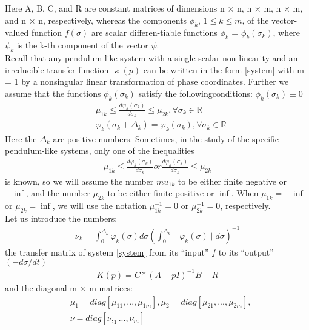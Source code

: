 \documentclass[a4paper]{article}
\begin{document}
Here A, B, C, and R are constant matrices of dimensions n × n, n × m, n × m, and n × n, respectively, whereas the components $\phi_k$, $1 \leq  k \leq m$, of the vector-valued function $f(\sigma)$ are scalar differen-tiable functions $\phi_k$ = $\phi_k(\sigma_k)$, where $\psi_k$ is the k-th component of the vector $\psi$.\\

Recall that any pendulum-like system with a single scalar non-linearity and an irreducible transfer function $\varkappa(p)$ can be written in the form \ref{system} with m = 1 by a nonsingular linear transformation of phase coordinates. Further we assume that the functions $\phi_k(\sigma_k)$ satisfy the followingconditions: $\phi_k(\sigma_k) \equiv 0$\\
 \begin{equation}
 \begin{aligned}
&\mu_{1k} \leq \frac{d\varphi_k(\sigma_k)}{d\sigma_k} \leq \mu_{2k}, \forall \sigma_k \in \mathbb{R}\\
&\varphi_k(\sigma_k+\Delta_k) = \varphi_k(\sigma_k), \forall \sigma_k \in \mathbb{R}
 \end{aligned}
\end{equation}
Here the $\Delta_k$ are positive numbers. Sometimes, in the study of the specific pendulum-like systems, only one of the inequalities
 \begin{equation}
 \begin{aligned}
\mu_{1k} \leq \frac{d\varphi_k(\sigma_k)}{d\sigma_k}  or \frac{d\varphi_k(\sigma_k)}{d\sigma_k} \leq \mu_{2k}
 \end{aligned}
\end{equation}
is known, so we will assume the number $mu_{1k}$ to be either finite negative or $-\inf$, and the number $\mu_{2k}$ to be either finite positive or $\inf$.
When $\mu_{1k} = -\inf$ or $\mu_{2k} = \inf$, we will use the notation $\mu_{1k}^{-1} = 0$ or $\mu_{2k}^{-1} = 0$, respectively.\\

Let us introduce the numbers:
 \begin{equation}
 \begin{aligned}
\nu_k = \int_{0}^{\Delta_k} \varphi_k(\sigma) d\sigma (\int_{0}^{\Delta_k} \mid \varphi_k(\sigma) \mid d\sigma)^{-1}
 \end{aligned}
\end{equation}
the transfer matrix of system \ref{system} from its “input” $f$ to its “output” $(-d\sigma/dt)$
 \begin{equation}
 \begin{aligned}
K(p) = C*(A - pI)^{-1}B - R
\end{aligned}
\end{equation}
and the diagonal m × m matrices:
 \begin{equation}
 \begin{aligned}
&\mu_1 = diag [\mu_{11}, . . . , \mu_{1m}],    \mu_2 = diag [\mu_{21}, . . . , \mu_{2m}],\\
&\nu = diag [\nu, _1. . . , \nu_m]
\end{aligned}
\end{equation}
\end{document}
